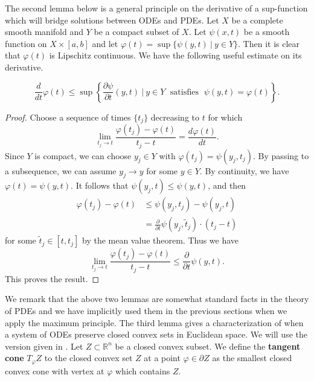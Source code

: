 The second lemma below is a general principle on the derivative of
a sup-function which will bridge solutions between ODEs and PDEs.
Let $X$ be a complete smooth manifold and $Y$ be a compact subset
of $X$. Let $\psi(x,t)$ be a smooth function on $X\times[a,b]$ and
let $\varphi (t)=\sup\{\psi(y,t)\ |\  y\in Y\}$. Then it is clear
that $\varphi(t)$ is Lipschitz continuous. We have the following
useful estimate on its derivative.

\begin{lemma}
  \label{lem:cz-derivative-of-a-fiberwise-supremum}
$$
\frac{d}{dt}\varphi(t) \le \sup\left\{\frac{\partial
\psi}{\partial t}(y,t)\ |\ y\in Y \; \mbox{ satisfies }\;
\psi(y,t)=\varphi(t)\right\}.
$$
\end{lemma}

\begin{proof}
Choose a sequence of times $\{t_j\}$ decreasing to $t$ for which
$$
\lim_{t_j\rightarrow t}\frac{\varphi(t_j)-\varphi(t)}{t_j-t}
=\frac{d\varphi(t)}{dt}.
$$
Since $Y$ is compact, we can choose $y_j\in Y$ with
$\varphi(t_j)=\psi(y_j,t_j)$. By passing to a subsequence, we can
assume $y_j\rightarrow y$ for some $y\in Y$. By continuity, we
have $\varphi(t)=\psi(y,t)$. It follows that $\psi(y_j,t)\le
\psi(y,t)$, and then
\begin{align*}
\varphi(t_j)-\varphi(t)&  \le \psi(y_j,t_j)-\psi(y_j,t)\\[2mm]
&  = \frac{\partial}{\partial t}\psi(y_j,\tilde{t}_j)\cdot(t_j-t)
\end{align*}
for some $\tilde{t}_j\in[t,t_j]$ by the mean value theorem. Thus
we have
$$
\lim_{t_j\rightarrow t}\frac{\varphi(t_j)-\varphi(t)}{t_j-t}
\le\frac{\partial}{\partial t}\psi(y,t).
$$
This proves the result.
\end{proof}

We remark that the above two lemmas are somewhat standard facts in
the theory of PDEs and we have implicitly used them in the
previous sections when we apply the maximum principle. The third
lemma gives a characterization of when a system of ODEs preserve
closed convex sets in Euclidean space. We will use the version
given in \cite{Cl04}. Let $Z\subset \mathbb R^n$ be a closed
convex subset. We define the {\bf tangent cone} $T_\varphi Z$ to the closed convex set $Z$ at a point
$\varphi\in
\partial Z$ as the smallest closed convex cone with vertex at
$\varphi$ which contains $Z$.


